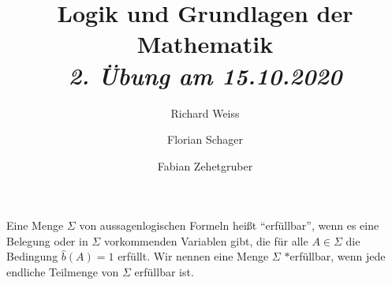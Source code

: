 \documentclass{article}
\title
{
  Logik und Grundlagen der Mathematik \\
  \vspace{4pt}
  \normalsize
  \textit{2. Übung am 15.10.2020}
}
\author
{
  Richard Weiss
  \and
  Florian Schager
  \and
  Fabian Zehetgruber
}
\date{}
\begin{document}
\maketitle

Eine Menge $\Sigma$ von aussagenlogischen Formeln heißt \enquote{erfüllbar}, wenn es eine Belegung oder in $\Sigma$ vorkommenden Variablen gibt, die für alle $A \in \Sigma$ die Bedingung $\hat{b}(A) = 1$ erfüllt.
Wir nennen eine Menge $\Sigma$ $\ast$erfüllbar, wenn jede endliche Teilmenge von $\Sigma$ erfüllbar ist.














\end{document}
